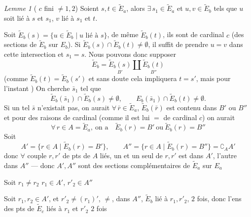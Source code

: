 \documentclass[11pt,a4paper]{article}
\begin{document}
\emph{Lemme 1} ( $c$ fini $\neq1,2$) Soient
$s,t\in\widetilde{E}_a$, alors $\exists\,s_1\in\widetilde{E}_a$ et
$u,v\in\widetilde{E}_b$ tels que $u$ soit lié à $s$ et $s_1$, $v$ lié à $s_1$ et
$t$.


Soit $\widetilde{E}_b(s)=\{u\in\widetilde{E}_b\mid u\text{ lié à }s\}$, de même
$\widetilde{E}_b(t)$, ils sont de cardinal $c$ (des sections de
$\widetilde{E}_b$ sur $E_b$). Si
$\widetilde{E}_b(s)\cap\widetilde{E}_b(t)\neq\emptyset$, il suffit de prendre
$u=v$  dans cette intersection et $s_1=s$. Nous pouvons donc
supposer
\[
  \widetilde{E}_b=\underset{B'}{\widetilde{E}_b(s)}\amalg
  \underset{B''}{\widetilde{E}_b(t)}
\]
(comme  $\widetilde{E}_b(t)=\widetilde{E}_b(s')$ et sans doute cela
impliquera $t=s'$, mais pour l'instant ) On cherche \struck{\ill{}} $\bar s_1$
tel que
\[
  \widetilde{E}_b(\bar s_1)\cap\widetilde{E}_b(s)\neq\emptyset,\qquad
  E_b(\bar s_1)\cap\widetilde{E}_b(t)\neq\emptyset .
\]
Si un tel $\bar s$ n'existait pas, on aurait
$\forall\,\bar r\in\widetilde{E}_a$, $\widetilde{E}_b(\bar r)$ est contenu dans
 $B'$ ou $B''$ et pour des raisons de cardinal
(comme il est lui $=$ de cardinal $c$)  on aurait
\[
  \forall\,r\in A=\widetilde{E}_a,\ \text{on a}\quad
  \widetilde{E}_b(r)=B'\ \text{ou}\ \widetilde{E}_b(r)=B''
\]
Soit
\[
  A'=\{r\in A\mid\widetilde{E}_b(r)=B'\},\qquad
  A''=\{r\in A\mid\widetilde{E}_b(r)=B''\}=\complement_A A'
\]
donc 
$\forall$ couple $r,r'$ de pts de $A$ liés, un et un seul de $r,r'$ est dans $A'$,
l'autre dans $A''$ — donc $A',A''$ sont des sections
complémentaires de $\widetilde{E}_a$ sur $E_a$

Soit  $r_1\neq r_2$
 $r_1\in A'$, $r'_2\in A''$
\struck{\ill{}}

Soit \struck{\ill{}} $r_1,r_2\in A'$,  et
$r'_2\neq(r_1)'$, \ill{} $\neq$, dans $A''$, $\widetilde{E}_b$ lié à
$r_1,r'_2$, $2$ fois, donc l'ens des pts de $\widetilde{E}_c$ liés à $r_1$ et
$r'_2$  $2$ fois \ill{}

\end{document}
